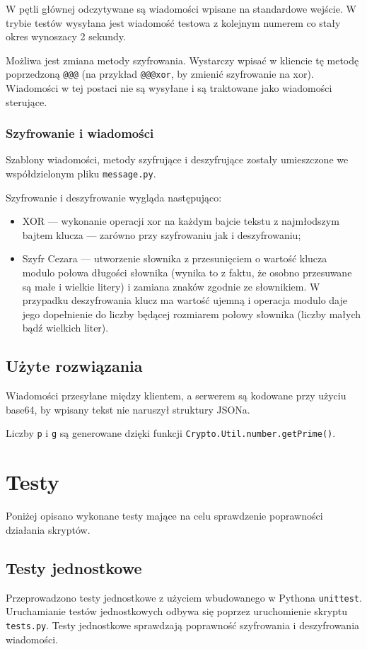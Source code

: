 \documentclass[a4paper]{article}
\begin{document}
W pętli głównej odczytywane są wiadomości wpisane na standardowe wejście. W trybie testów wysyłana jest wiadomość testowa z kolejnym numerem co stały okres wynoszacy 2 sekundy.

Możliwa jest zmiana metody szyfrowania. Wystarczy wpisać w kliencie tę metodę poprzedzoną \texttt{@@@} (na przykład \texttt{@@@xor}, by zmienić szyfrowanie na xor). Wiadomości w tej postaci nie są wysyłane i są traktowane jako wiadomości sterujące.

\subsubsection{Szyfrowanie i wiadomości}
Szablony wiadomości, metody szyfrujące i deszyfrujące zostały umieszczone we współdzielonym pliku \texttt{message.py}.

Szyfrowanie i deszyfrowanie wygląda następująco:
\begin{itemize}
	\item XOR --- wykonanie operacji xor na każdym bajcie tekstu z najmłodszym bajtem klucza --- zarówno przy szyfrowaniu jak i deszyfrowaniu;
	\item Szyfr Cezara --- utworzenie słownika z przesunięciem o wartość klucza modulo połowa długości słownika (wynika to z faktu, że osobno przesuwane są małe i wielkie litery) i zamiana znaków zgodnie ze słownikiem. W przypadku deszyfrowania klucz ma wartość ujemną i operacja modulo daje jego dopełnienie do liczby będącej rozmiarem połowy słownika (liczby małych bądź wielkich liter).
\end{itemize}

\subsection{Użyte rozwiązania}
Wiadomości przesyłane między klientem, a serwerem są kodowane przy użyciu base64, by wpisany tekst nie naruszył struktury JSONa.

Liczby \texttt{p} i \texttt{g} są generowane dzięki funkcji \texttt{Crypto.Util.number.getPrime()}.

\section{Testy}
Poniżej opisano wykonane testy mające na celu sprawdzenie poprawności działania skryptów.

\subsection{Testy jednostkowe}
Przeprowadzono testy jednostkowe z użyciem wbudowanego w Pythona \texttt{unittest}. Uruchamianie testów jednostkowych odbywa się poprzez uruchomienie skryptu \texttt{tests.py}. Testy jednostkowe sprawdzają poprawność szyfrowania i deszyfrowania wiadomości.
\end{document}
